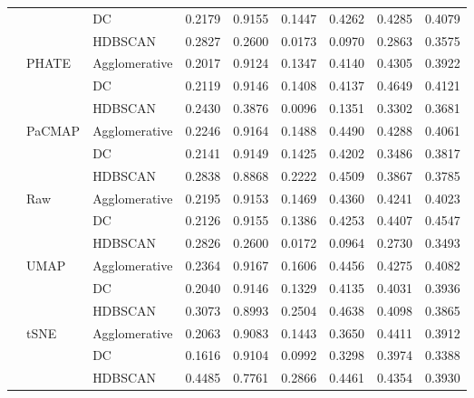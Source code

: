 \begin{tabular}{lllrrrrrr}
 &  & DC & 0.2179 & 0.9155 & 0.1447 & 0.4262 & 0.4285 & 0.4079 \\
 &  & HDBSCAN & 0.2827 & 0.2600 & 0.0173 & 0.0970 & 0.2863 & 0.3575 \\
\cline{2-9}
 & \multirow[t]{3}{*}{PHATE} & Agglomerative & 0.2017 & 0.9124 & 0.1347 & 0.4140 & 0.4305 & 0.3922 \\
 &  & DC & 0.2119 & 0.9146 & 0.1408 & 0.4137 & 0.4649 & 0.4121 \\
 &  & HDBSCAN & 0.2430 & 0.3876 & 0.0096 & 0.1351 & 0.3302 & 0.3681 \\
\cline{2-9}
 & \multirow[t]{3}{*}{PaCMAP} & Agglomerative & 0.2246 & 0.9164 & 0.1488 & 0.4490 & 0.4288 & 0.4061 \\
 &  & DC & 0.2141 & 0.9149 & 0.1425 & 0.4202 & 0.3486 & 0.3817 \\
 &  & HDBSCAN & 0.2838 & 0.8868 & 0.2222 & 0.4509 & 0.3867 & 0.3785 \\
\cline{2-9}
 & \multirow[t]{3}{*}{Raw} & Agglomerative & 0.2195 & 0.9153 & 0.1469 & 0.4360 & 0.4241 & 0.4023 \\
 &  & DC & 0.2126 & 0.9155 & 0.1386 & 0.4253 & 0.4407 & 0.4547 \\
 &  & HDBSCAN & 0.2826 & 0.2600 & 0.0172 & 0.0964 & 0.2730 & 0.3493 \\
\cline{2-9}
 & \multirow[t]{3}{*}{UMAP} & Agglomerative & 0.2364 & 0.9167 & 0.1606 & 0.4456 & 0.4275 & 0.4082 \\
 &  & DC & 0.2040 & 0.9146 & 0.1329 & 0.4135 & 0.4031 & 0.3936 \\
 &  & HDBSCAN & 0.3073 & 0.8993 & 0.2504 & 0.4638 & 0.4098 & 0.3865 \\
\cline{2-9}
 & \multirow[t]{3}{*}{tSNE} & Agglomerative & 0.2063 & 0.9083 & 0.1443 & 0.3650 & 0.4411 & 0.3912 \\
 &  & DC & 0.1616 & 0.9104 & 0.0992 & 0.3298 & 0.3974 & 0.3388 \\
 &  & HDBSCAN & 0.4485 & 0.7761 & 0.2866 & 0.4461 & 0.4354 & 0.3930 \\
\cline{1-9} \cline{2-9}
\bottomrule
\end{tabular}
